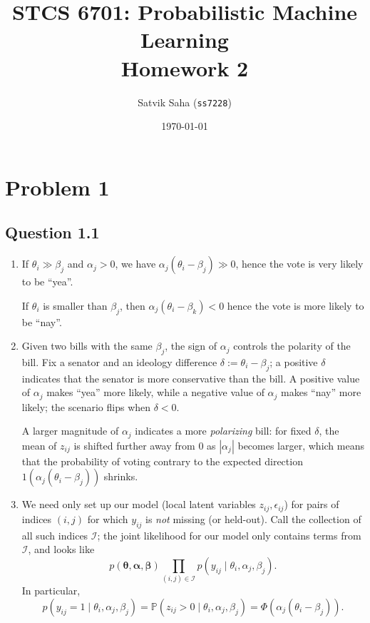 \documentclass[12pt]{article}
\title{
    STCS 6701: Probabilistic Machine Learning \\
    Homework 2%
}
\author{
    Satvik Saha ({\tt ss7228})%
}
\date{
    \vspace{-1.2em}
    \today%
}
\renewcommand{\Pr}{\mathbb{P}}
\begin{document}
\maketitle



\section*{Problem 1}

\subsection*{Question 1.1}


\begin{enumerate}[label=(\alph*)]
    \item If $\theta_i \gg \beta_j$ and $\alpha_j > 0$, we have
    $\alpha_j(\theta_i - \beta_j) \gg 0$, hence the vote is very likely to be
    ``yea''.

    If $\theta_i$ is smaller than $\beta_j$, then $\alpha_j(\theta_i - \beta_k)
    < 0$ hence the vote is more likely to be ``nay''.


    \item Given two bills with the same $\beta_j$, the sign of $\alpha_j$
    controls the polarity of the bill.
    Fix a senator and an ideology difference $\delta := \theta_i - \beta_j$;
    a positive $\delta$ indicates that the senator is more conservative than
    the bill.
    A positive value of $\alpha_j$ makes ``yea'' more likely, while a negative
    value of $\alpha_j$ makes ``nay'' more likely; the scenario flips when
    $\delta < 0$.

    A larger magnitude of $\alpha_j$ indicates a more \emph{polarizing} bill:
    for fixed $\delta$, the mean of $z_{ij}$ is shifted further away from $0$
    as $|\alpha_j|$ becomes larger, which means that the probability of voting
    contrary to the expected direction $1(\alpha_j(\theta_i - \beta_j))$ shrinks.


    \item We need only set up our model (local latent variables $z_{ij},
    \epsilon_{ij}$) for pairs of indices $(i, j)$ for which $y_{ij}$ is
    \emph{not} missing (or held-out).
    Call the collection of all such indices $\mathscr{I}$; the joint likelihood
    for our model only contains terms from $\mathscr{I}$, and looks like \[
        p(\bm{\theta}, \bm{\alpha}, \bm{\beta}) \prod_{(i, j) \in \mathscr{I}} p(y_{ij} \mid \theta_i, \alpha_j, \beta_j).
    \] In particular, \[
        p(y_{ij} = 1\mid \theta_i, \alpha_j, \beta_j)
            = \Pr(z_{ij} > 0 \mid \theta_i, \alpha_j, \beta_j)
            = \Phi(\alpha_j(\theta_i - \beta_j)).
    \] 



\end{enumerate}
\end{document}
